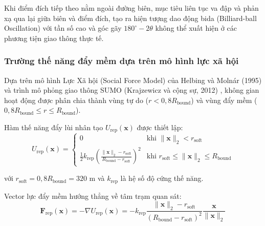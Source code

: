 Khi điểm đích tiếp theo nằm ngoài đường biên, mục tiêu liên tục va đập và phản xạ qua lại giữa biên và điểm đích, tạo ra hiện tượng dao động bida (Billiard-ball Oscillation) với tần số cao và góc gãy $180^\circ - 2\theta$ không thể xuất hiện ở các phương tiện giao thông thực tế.

\subsubsection{Trường thế năng đẩy mềm dựa trên mô hình lực xã hội}

\hspace{0.5cm} Dựa trên mô hình Lực Xã hội (Social Force Model) của Helbing và Molnár (1995) \cite{helbing1995social} và trình mô phỏng giao thông SUMO (Krajzewicz và cộng sự, 2012) \cite{krajzewicz2012sumo}, không gian hoạt động được phân chia thành vùng tự do ($r < 0{,}8 R_{\text{bound}}$) và vùng đẩy mềm ($0{,}8 R_{\text{bound}} \le r \le R_{\text{bound}}$).

Hàm thế năng đẩy lùi nhân tạo $U_{\text{rep}}(\mathbf{x})$ được thiết lập:
\begin{equation}
U_{\text{rep}}(\mathbf{x}) = \begin{cases}
0 & \text{khi } \|\mathbf{x}\|_2 < r_{\text{soft}} \\
\frac{1}{2} k_{\text{rep}} \left( \frac{\|\mathbf{x}\|_2 - r_{\text{soft}}}{R_{\text{bound}} - r_{\text{soft}}} \right)^2 & \text{khi } r_{\text{soft}} \le \|\mathbf{x}\|_2 \le R_{\text{bound}}
\end{cases}
\label{eq:soft-repulsion-potential-field}
\end{equation}

với $r_{\text{soft}} = 0{,}8 R_{\text{bound}} = 320$ m và $k_{\text{rep}}$ là hệ số độ cứng thế năng.

Vector lực đẩy mềm hướng thẳng về tâm trạm quan sát:
\begin{equation}
\mathbf{F}_{\text{rep}}(\mathbf{x}) = -\nabla U_{\text{rep}}(\mathbf{x}) = -k_{\text{rep}} \frac{\|\mathbf{x}\|_2 - r_{\text{soft}}}{(R_{\text{bound}} - r_{\text{soft}})^2} \frac{\mathbf{x}}{\|\mathbf{x}\|_2}
\label{eq:soft-repulsion-force-gradient}
\end{equation}

